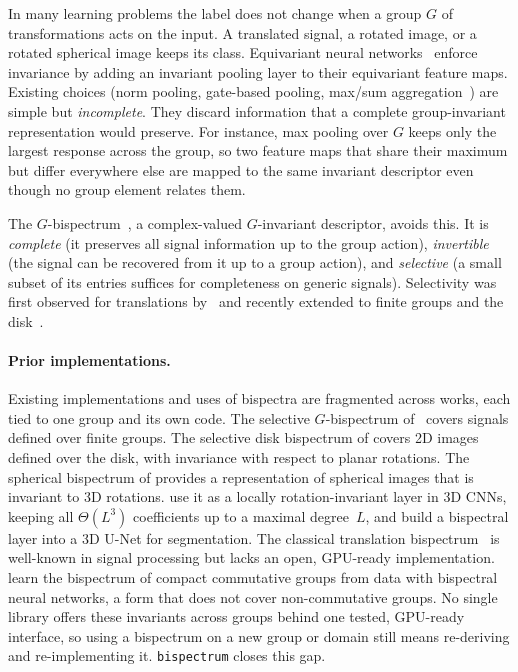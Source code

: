 \documentclass{article}
\theoremstyle{definition}
\theoremstyle{remark}
\theoremstyle{definition}
\begin{document}
In many learning problems the label does not change when a group $G$ of transformations acts on
the input. A translated signal, a rotated image, or a rotated spherical image keeps its class.
Equivariant neural networks~\citep{cohen2016group, weiler2019general} enforce invariance by adding an invariant pooling layer to their equivariant feature maps.
Existing choices (norm pooling, gate-based pooling, max/sum
aggregation~\citep{weiler2019general}) are simple but
\emph{incomplete}. They discard information that a complete
group-invariant representation would preserve. For instance, max pooling over $G$ keeps only the largest response across the group, so two feature maps that share their maximum but differ everywhere else are mapped to the same invariant
descriptor even though no group element relates them.

The $G$-bispectrum~\citep{tukey1953spectral, giannakis1989bispectrum, kakarala2012bispectrum,
sanborn2023bispectral, mataigne2024selective, myers2025selective}, a complex-valued
$G$-invariant descriptor, avoids this. It is \textit{complete} (it preserves all signal
information up to the group action), \textit{invertible} (the signal can be recovered from
it up to a group action), and \textit{selective} (a small subset of its entries suffices for
completeness on generic signals). Selectivity was first observed for translations
by~\citet{giannakis1989bispectrum} and recently extended to finite groups and the
disk~\citep{mataigne2024selective,myers2025selective}.

\paragraph{Prior implementations.} Existing implementations and uses of bispectra are
fragmented across works, each tied to one group and its own code. The selective $G$-bispectrum
of~\citet{mataigne2024selective} covers signals defined over finite groups. The selective disk bispectrum of
\citet{myers2025selective} covers 2D images defined over the disk, with invariance with respect to planar rotations. The spherical bispectrum of \citet{kakarala2012bispectrum} provides a representation of spherical images that is invariant to 3D rotations. \citet{oreiller2020solid} use it as a locally rotation-invariant layer in 3D CNNs, keeping all $\Theta(L^3)$ coefficients up to a maximal degree~$L$, and \citet{chevalley2024bispectral} build a bispectral layer into a 3D U-Net for segmentation. The classical translation bispectrum~\citep{tukey1953spectral, giannakis1989bispectrum} is well-known in signal processing but lacks an open, GPU-ready implementation. \citet{sanborn2023bispectral} learn the bispectrum of compact commutative groups from data with bispectral neural networks, a form that does not cover non-commutative groups.
No single library offers these invariants across groups behind one tested, GPU-ready
interface, so using a bispectrum on a new group or domain still means re-deriving and
re-implementing it. \texttt{bispectrum} closes this gap.
\end{document}
